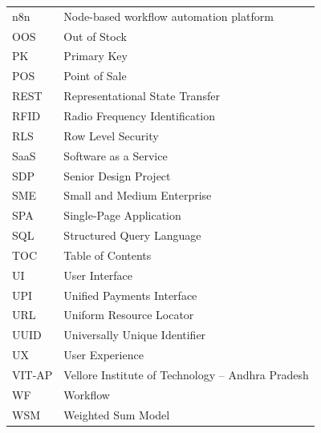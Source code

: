 {\begin{longtable}{@{}p{} p{}@{}}
n8n     & Node-based workflow automation platform \\
OOS     & Out of Stock \\
PK      & Primary Key \\
POS     & Point of Sale \\
REST    & Representational State Transfer \\
RFID    & Radio Frequency Identification \\
RLS     & Row Level Security \\
SaaS    & Software as a Service \\
SDP     & Senior Design Project \\
SME     & Small and Medium Enterprise \\
SPA     & Single-Page Application \\
SQL     & Structured Query Language \\
TOC     & Table of Contents \\
UI      & User Interface \\
UPI     & Unified Payments Interface \\
URL     & Uniform Resource Locator \\
UUID    & Universally Unique Identifier \\
UX      & User Experience \\
VIT-AP  & Vellore Institute of Technology -- Andhra Pradesh \\
WF      & Workflow \\
WSM     & Weighted Sum Model \\
\bottomrule
\end{longtable}
}
\clearpage
